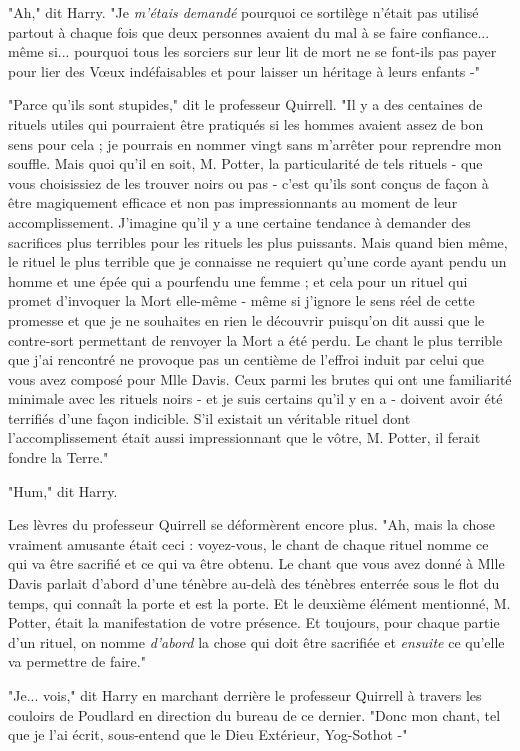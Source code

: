"Ah," dit Harry. "Je \emph{m'étais demandé}  pourquoi ce sortilège n'était pas utilisé partout à chaque fois que deux personnes avaient du mal à se faire confiance... même si... pourquoi tous les sorciers sur leur lit de mort ne se font-ils pas payer pour lier des Vœux indéfaisables et pour laisser un héritage à leurs enfants -"

"Parce qu'ils sont stupides," dit le professeur Quirrell. "Il y a des centaines de rituels utiles qui pourraient être pratiqués si les hommes avaient assez de bon sens pour cela ; je pourrais en nommer vingt sans m'arrêter pour reprendre mon souffle. Mais quoi qu'il en soit, M. Potter, la particularité de tels rituels - que vous choisissiez de les trouver noirs ou pas - c'est qu'ils sont conçus de façon à être magiquement efficace et non pas impressionnants au moment de leur accomplissement. J'imagine qu'il y a une certaine tendance à demander des sacrifices plus terribles pour les rituels les plus puissants. Mais quand bien même, le rituel le plus terrible que je connaisse ne requiert qu'une corde ayant pendu un homme et une épée qui a pourfendu une femme ; et cela pour un rituel qui promet d'invoquer la Mort elle-même - même si j'ignore le sens réel de cette promesse et que je ne souhaites en rien le découvrir puisqu'on dit aussi que le contre-sort permettant de renvoyer la Mort a été perdu. Le chant le plus terrible que j'ai rencontré ne provoque pas un centième de l'effroi induit par celui que vous avez composé pour Mlle Davis. Ceux parmi les brutes qui ont une familiarité minimale avec les rituels noirs - et je suis certains qu'il y en a - doivent avoir été terrifiés d'une façon indicible. S'il existait un véritable rituel dont l'accomplissement était aussi impressionnant que le vôtre, M. Potter, il ferait fondre la Terre."

"Hum," dit Harry.

Les lèvres du professeur Quirrell se déformèrent encore plus. "Ah, mais la chose vraiment amusante était ceci : voyez-vous, le chant de chaque rituel nomme ce qui va être sacrifié et ce qui va être obtenu. Le chant que vous avez donné à Mlle Davis parlait d'abord d'une ténèbre au-delà des ténèbres enterrée sous le flot du temps, qui connaît la porte et est la porte. Et le deuxième élément mentionné, M. Potter, était la manifestation de votre présence. Et toujours, pour chaque partie d'un rituel, on nomme \emph{d'abord}  la chose qui doit être sacrifiée et \emph{ensuite}  ce qu'elle va permettre de faire."

"Je... vois," dit Harry en marchant derrière le professeur Quirrell à travers les couloirs de Poudlard en direction du bureau de ce dernier. "Donc mon chant, tel que je l'ai écrit, sous-entend que le Dieu Extérieur, Yog-Sothot -"


